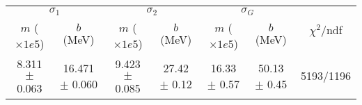 \begin{tabular}{cc|cc|cc||c}
\multicolumn{2}{c|}{$\sigma_1$} & \multicolumn{2}{|c}{$\sigma_2$} & \multicolumn{2}{|c}{$\sigma_G$}  & \multirow{2}{*}{$\chi^2/$ndf}\\
$m$ ($\times1e5$) & $b$ (MeV) & $m$ ($\times1e5$) & $b$ (MeV) & $m$ ($\times1e5$) & $b$ (MeV) & \\
\hline
8.311 $\pm$ 0.063 & 16.471 $\pm$ 0.060 & 9.423 $\pm$ 0.085 & 27.42 $\pm$ 0.12 & 16.33 $\pm$ 0.57 & 50.13 $\pm$ 0.45 & 5193/1196\\
\end{tabular}
